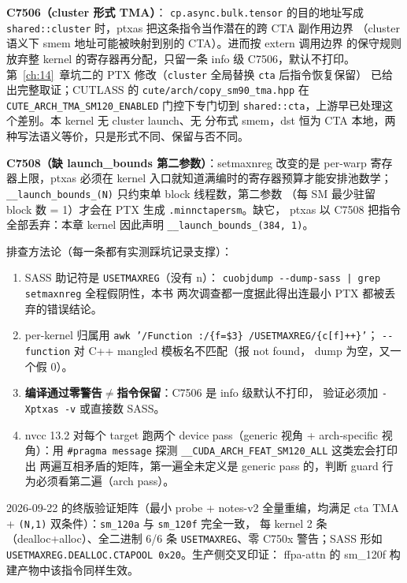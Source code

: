\textbf{C7506（cluster 形式 TMA）}：
\texttt{cp.\allowbreak{}async.\allowbreak{}bulk.\allowbreak{}tensor} 的目的地址写成
\texttt{shared::cluster} 时，ptxas 把这条指令当作潜在的跨 CTA 副作用边界
（cluster 语义下 smem 地址可能被映射到别的 CTA）。进而按 extern 调用边界
的保守规则放弃整 kernel 的寄存器再分配，只留一条 info 级 C7506，默认不打印。
第~\ref{ch:14}~章坑二的 PTX 修改（\texttt{cluster} 全局替换 \texttt{cta} 后指令恢复保留）
已给出完整取证；CUTLASS 的 \texttt{cute/arch/copy\_sm90\_tma.hpp} 在
\texttt{CUTE\_\allowbreak{}ARCH\_\allowbreak{}TMA\_\allowbreak{}SM120\_\allowbreak{}ENABLED} 门控下专门切到
\texttt{shared::cta}，上游早已处理这个差别。本 kernel 无 cluster launch、无
分布式 smem，dst 恒为 CTA 本地，两种写法语义等价，只是形式不同、保留与否不同。

\textbf{C7508（缺 launch\_bounds 第二参数）}：setmaxnreg 改变的是 per-warp
寄存器上限，ptxas 必须在 kernel 入口就知道满编时的寄存器预算才能安排池数学；
\texttt{\_\_launch\_\allowbreak{}bounds\_\allowbreak{}(N)} 只约束单 block 线程数，第二参数
（每 SM 最少驻留 block 数 = 1）才会在 PTX 生成 \texttt{.minnctapersm}。缺它，
ptxas 以 C7508 把指令全部丢弃：本章 kernel 因此声明
\texttt{\_\_launch\_\allowbreak{}bounds\_\allowbreak{}(384,~1)}。

排查方法论（每一条都有实测踩坑记录支撑）：
\begin{enumerate}[itemsep=1pt,topsep=2pt]
  \item SASS 助记符是 \texttt{USETMAXREG}（没有 n）：
        \texttt{cuobjdump -{}-dump-sass | grep setmaxnreg} 全程假阴性，本书
        两次调查都一度据此得出连最小 PTX 都被丢弃的错误结论。
  \item per-kernel 归属用
        \texttt{awk '/Function :/\{f=\$3\} /USETMAXREG/\{c[f]++\}'}；
        \texttt{-{}-function} 对 C++ mangled 模板名不匹配（报 not found，
        dump 为空，又一个假 0）。
  \item \textbf{编译通过零警告}$\neq$\textbf{指令保留}：C7506 是 info 级默认不打印，
        验证必须加 \texttt{-Xptxas -v} 或直接数 SASS。
  \item nvcc 13.2 对每个 target 跑两个 device pass（generic 视角 +
        arch-specific 视角）：用 \texttt{\#pragma message} 探测
        \texttt{\_\_CUDA\_ARCH\_FEAT\_\allowbreak{}SM120\_\allowbreak{}ALL} 这类宏会打印出
        两遍互相矛盾的矩阵，第一遍全未定义是 generic pass 的，判断
        guard 行为必须看第二遍（arch pass）。
\end{enumerate}

2026-09-22 的终版验证矩阵（最小 probe + notes-v2 全量重编，均满足
cta TMA + \texttt{(N,1)} 双条件）：\texttt{sm\_120a} 与 \texttt{sm\_120f} 完全一致，
每 kernel 2 条（dealloc+alloc）、全二进制 6/6 条 \texttt{USETMAXREG}、零 C750x
警告；SASS 形如 \texttt{USETMAXREG.DEALLOC.CTAPOOL 0x20}。生产侧交叉印证：
ffpa-attn 的 sm\_120f 构建产物中该指令同样生效。

